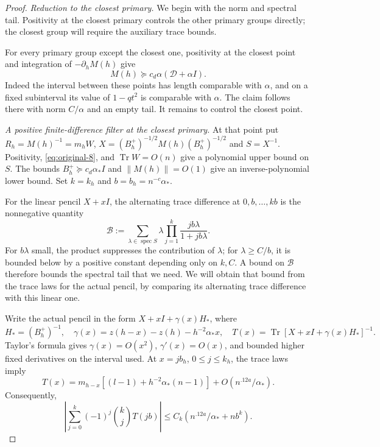 \begin{proof}
\emph{Reduction to the closest primary.}
We begin with the norm and spectral tail. Positivity at the closest
primary controls the other primary groups directly; the closest group
will require the auxiliary trace bounds.

For every primary group except the closest one, positivity at the
closest point and integration of $-\partial_hM(h)$ give
\[
 M(h)\succeq c_d\alpha(\mathcal D+\alpha I).
\]
Indeed the interval between these points has length comparable with
$\alpha$, and on a fixed subinterval its value of $1-qt^2$ is
comparable with $\alpha$. The claim follows there with norm $C/\alpha$
and an empty tail. It remains to control the closest point.

\emph{A positive finite-difference filter at the closest primary.}
At that point put $R_h=M(h)^{-1}=m_hW$,
$X=(B_h^+)^{-1/2}M(h)(B_h^+)^{-1/2}$ and $S=X^{-1}$. Positivity,
\eqref{eq:original-8}, and $\operatorname{Tr}W=O(n)$ give a polynomial
upper bound on $S$. The bounds $B_h^+\succeq c_d\alpha_*I$ and
$\|M(h)\|=O(1)$ give an inverse-polynomial lower bound. Set
$k=k_h$ and $b=b_h=n^{-c}\alpha_*$.

For the linear pencil $X+xI$, the alternating trace difference at
$0,b,\ldots,kb$ is the nonnegative quantity
\begin{equation}
 \mathcal B:=\sum_{\lambda\in\operatorname{spec}S}
   \lambda\prod_{j=1}^k\frac{jb\lambda}{1+jb\lambda}.
 \label{eq:original-9}
\end{equation}
For $b\lambda$ small, the product suppresses the contribution of
$\lambda$; for $\lambda\ge C/b$, it is bounded below by a positive
constant depending only on $k,C$. A bound on $\mathcal B$ therefore
bounds the spectral tail that we need. We will obtain that bound from
the trace laws for the actual pencil, by comparing its alternating
trace difference with this linear one.

Write the actual pencil in the form $X+xI+\gamma(x)H_*$, where
\[
 H_*=(B_h^+)^{-1},\quad
 \gamma(x)=z(h-x)-z(h)-h^{-2}\alpha_*x,\quad
 T(x)=\operatorname{Tr}[X+xI+\gamma(x)H_*]^{-1}.
\]
Taylor's formula gives $\gamma(x)=O(x^2)$,
$\gamma'(x)=O(x)$, and bounded higher fixed derivatives on the
interval used. At $x=jb_h$, $0\le j\le k_h$, the trace laws imply
\[
 T(x)=m_{h-x}[(l-1)+h^{-2}\alpha_*(n-1)]
          +O(n^{.12a}/\alpha_*).
\]
Consequently,
\[
 \left|\sum_{j=0}^k(-1)^j\binom kjT(jb)\right|
 \le C_k(n^{.12a}/\alpha_*+nb^k).
\]


\end{proof}
